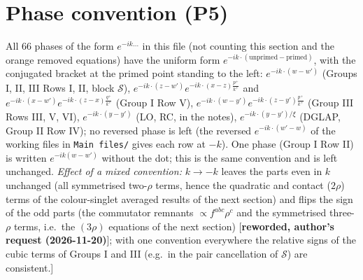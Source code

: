 {\color{red}
\section{Phase convention (P5)}
 All 66 phases of the form $e^{-ik\dots}$ in this file (not counting this section and the orange removed equations) have the uniform form $e^{-ik\cdot(\text{unprimed}-\text{primed})}$, with the conjugated bracket at the primed point standing to the left: $e^{-ik\cdot(w-w')}$ (Groups I, II, III Rows I, II, block $\mathcal{S}$), $e^{-ik\cdot(z-w')}e^{-ik\cdot(x-z)\frac{p^{+}}{k^{+}}}$ and $e^{-ik\cdot(x-w')}e^{-ik\cdot(z-x)\frac{q^{+}}{k^{+}}}$ (Group I Row V), $e^{-ik\cdot(w-y')}e^{-ik\cdot(z-y')\frac{p^{+}}{k^{+}}}$ (Group III Rows III, V, VI), $e^{-ik\cdot(y-y')}$ (LO, RC, in the notes), $e^{-ik\cdot(y-y')/\xi}$ (DGLAP, Group II Row IV); no reversed phase is left (the reversed $e^{-ik\cdot(w'-w)}$ of the working files in \texttt{Main files/} gives each row at $-k$). One phase (Group I Row II) is written $e^{-ik(w-w')}$ without the dot; this is the same convention and is left unchanged. \emph{Effect of a mixed convention:} $k\to-k$ leaves the parts even in $k$ unchanged (all symmetrised two-$\rho$ terms, hence the quadratic and contact ($2\rho$) terms of the colour-singlet averaged results of the next section) and flips the sign of the odd parts (the commutator remnants $\propto f^{abc}\rho^{c}$ and the symmetrised three-$\rho$ terms, i.e.\ the $(3\rho)$ equations of the next section) [\textbf{reworded, author's request (2026-11-20)}]; with one convention everywhere the relative signs of the cubic terms of Groups I and III (e.g.\ in the pair cancellation of $\mathcal{S}$) are consistent.]}\par
